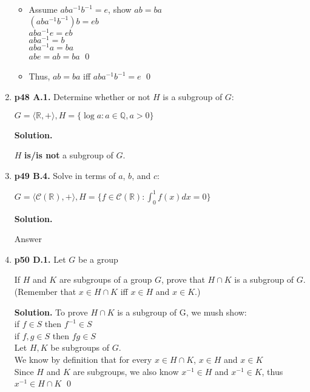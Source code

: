 \documentclass[11pt]{article}
\begin{document}
\begin{enumerate}
\begin{itemize}
	  
	  \item Assume $aba^{-1}b^{-1} = e$, show $ab = ba$ \\
	  $(aba^{-1}b^{-1})b = eb$ \\
	  $aba^{-1}e = eb$ \\
	  $aba^{-1} = b$ \\
	  $aba^{-1}a = ba$ \\
	  $abe = ab = ba$ \qed \\
	  
	  \item Thus, $ab = ba$ iff $aba^{-1}b^{-1} = e$ \qed
  
  \end{itemize}
  
\newpage
 
\item {\bfseries p48 A.1.} Determine whether or not $H$ is a subgroup of $G$:
  
  $G = \langle \mathbb{R},+\rangle, H = \{\log a : a \in \mathbb{Q}, a>0\}$
  
  {\bfseries Solution.}
  
  $H$ {\bfseries is/is not} a subgroup of $G$. \\

\item {\bfseries p49 B.4.}
  Solve in terms of $a$, $b$, and $c$:
  
  $G = \langle \mathscr{C}(\mathbb{R}),+\rangle, H = \{f \in \mathscr{C}(\mathbb{R}) : \int_{0}^{1} f(x) dx = 0\}$
  
  {\bfseries Solution.}
  
  Answer \\
 
\newpage
 
\item {\bfseries p50 D.1.} Let $G$ be a group
  
  If $H$ and $K$ are subgroups of a group $G$, prove that $H \cap K$ is a subgroup of $G$. (Remember that $x \in H \cap K$ iff $x \in H$ and $x \in K$.)
  
  {\bfseries Solution.} To prove $H \cap K$ is a subgroup of G, we mush show: \\
  if $f \in S$ then $f^{-1} \in S$ \\
  if $f,g \in S$ then $fg \in S$ \\
  
  Let $H, K$ be subgroups of $G$. \\
  We know by definition that for every $x \in H \cap K$, $x \in H$ and $x \in K$ \\
  Since $H$ and $K$ are subgroups, we also know $x^{-1} \in H$ and $x^{-1} \in K$, thus $x^{-1} \in H \cap K$ \qed \\
  

\end{enumerate}
\end{document}
